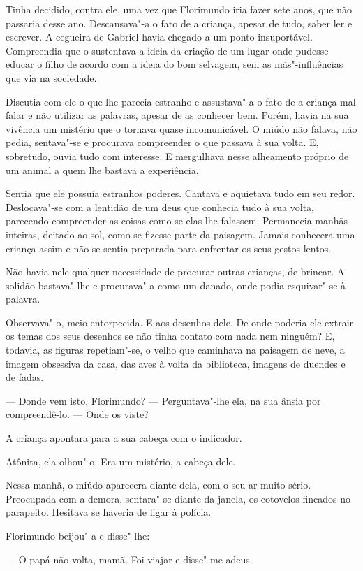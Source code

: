 Tinha decidido, contra ele, uma vez que Florimundo iria fazer sete anos,
que não passaria desse ano. Descansava"-a o fato de a criança, apesar de
tudo, saber ler e escrever. A cegueira de Gabriel havia chegado a um
ponto insuportável. Compreendia que o sustentava a ideia da criação de
um lugar onde pudesse educar o filho de acordo com a ideia do bom
selvagem, sem as más"-influências que via na sociedade.

Discutia com ele o que lhe parecia estranho e assustava"-a o fato de a
criança mal falar e não utilizar as palavras, apesar de as conhecer bem.
Porém, havia na sua vivência um mistério que o tornava quase
incomunicável. O miúdo não falava, não pedia, sentava"-se e procurava
compreender o que passava à sua volta. E, sobretudo, ouvia tudo com
interesse. E mergulhava nesse alheamento próprio de um animal a quem lhe
bastava a experiência.

Sentia que ele possuía estranhos poderes. Cantava e aquietava tudo em
seu redor. Deslocava"-se com a lentidão de um deus que conhecia tudo à
sua volta, parecendo compreender as coisas como se elas lhe falassem.
Permanecia manhãs inteiras, deitado ao sol, como se fizesse parte da
paisagem. Jamais conhecera uma criança assim e não se sentia preparada
para enfrentar os seus gestos lentos.

Não havia nele qualquer necessidade de procurar outras crianças, de
brincar. A solidão bastava"-lhe e procurava"-a como um danado, onde podia
esquivar"-se à palavra.

Observava"-o, meio entorpecida. E aos desenhos dele. De onde poderia ele
extrair os temas dos seus desenhos se não tinha contato com nada nem
ninguém? E, todavia, as figuras repetiam"-se, o velho que caminhava na
paisagem de neve, a imagem obsessiva da casa, das aves à volta da
biblioteca, imagens de duendes e de fadas.

--- Donde vem isto, Florimundo? --- Perguntava"-lhe ela, na sua ânsia por
compreendê-lo. ---  Onde os viste?

A criança apontara para a sua cabeça com o indicador.

Atônita, ela olhou"-o. Era um mistério, a cabeça dele.

Nessa manhã, o miúdo aparecera diante dela, com o seu ar muito sério.
Preocupada com a demora, sentara"-se diante da janela, os cotovelos
fincados no parapeito. Hesitava se haveria de ligar à polícia.

Florimundo beijou"-a e disse"-lhe:

--- O papá não volta, mamã. Foi viajar e disse"-me adeus.

